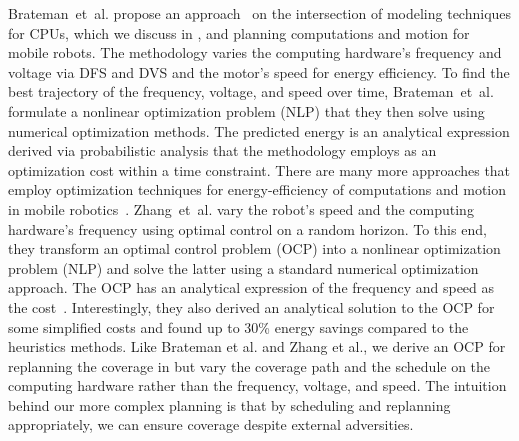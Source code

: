 Brateman~et~al. propose an approach~\citep{brateman2006energy} on the intersection of modeling techniques for CPUs, which we discuss in , and planning computations and motion for mobile robots. The methodology varies the computing hardware's frequency and voltage via DFS and DVS and the motor's speed for energy efficiency. To find the best trajectory of the frequency, voltage, and speed over time, Brateman~et~al. formulate a nonlinear optimization problem (NLP) that they then solve using numerical optimization methods. The predicted energy is an analytical expression derived via probabilistic analysis that the methodology employs as an optimization cost within a time constraint. There are many more approaches that employ optimization techniques for energy-efficiency of computations and motion in mobile robotics~\citep{zhang2007low,ondruska2015scheduled,lahijanian2018resource}. Zhang~et~al. vary the robot's speed and the computing hardware's frequency using optimal control on a random horizon. To this end, they transform an optimal control problem (OCP) into a nonlinear optimization problem (NLP) and solve the latter using a standard numerical optimization approach. The OCP has an analytical expression of the frequency and speed as the cost~\citep{zhang2007low}. Interestingly, they also derived an analytical solution to the OCP for some simplified costs and found up to 30\% energy savings compared to the heuristics methods. Like Brateman et al. and Zhang et al., we derive an OCP for replanning the coverage in  but vary the coverage path and the schedule on the computing hardware rather than the frequency, voltage, and speed. The intuition behind our more complex planning is that by scheduling and replanning appropriately, we can ensure coverage despite external adversities.

